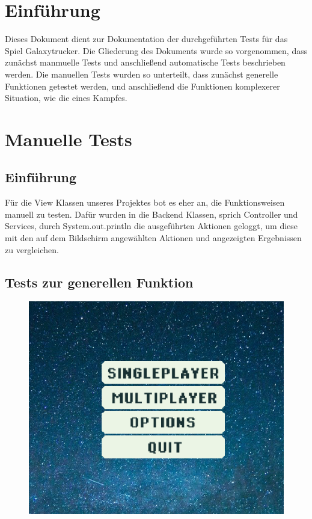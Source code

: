 \documentclass[fontsize=12pt,paper=a4,twoside]{scrartcl}
\begin{document}
\tableofcontents

\newpage

\section{Einführung}
Dieses Dokument dient zur Dokumentation der durchgeführten Tests für das Spiel Galaxytrucker. Die Gliederung des Dokuments wurde so vorgenommen, dass zunächst manmuelle Tests und anschließend automatische Tests beschrieben werden. Die manuellen Tests wurden so unterteilt, dass zunächst generelle Funktionen getestet werden, und anschließend die Funktionen komplexerer Situation, wie die eines Kampfes. \\

\section{Manuelle Tests}

\subsection{Einführung}
Für die View Klassen unseres Projektes bot es eher an, die Funktionsweisen manuell zu testen. 
Dafür wurden in die Backend Klassen, sprich Controller und Services, durch System.out.println die ausgeführten Aktionen geloggt, um diese mit den auf dem Bildschirm angewählten Aktionen und angezeigten Ergebnissen zu vergleichen. \\



\subsection{Tests zur generellen Funktion}
\begin{figure}[h!]
\centering
\includegraphics[width=0.5\linewidth]{images/mainmenu.png}
\end{figure}
\end{document}
